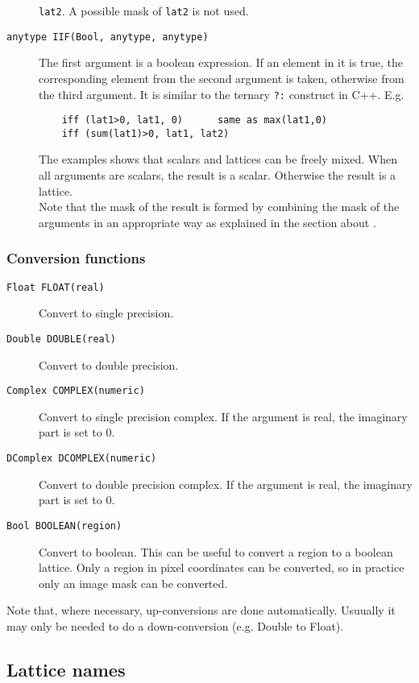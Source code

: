 \begin{description}
    \texttt{lat2}. A possible mask of \texttt{lat2} is not used.
  \item[ \texttt{anytype IIF(Bool, anytype, anytype)}]
    The first argument is a boolean expression. If an element in
    it is true, the corresponding element from the second argument is
    taken, otherwise from the third argument. It is similar to the
    ternary \texttt{?:} construct in C++. E.g.
    \begin{verbatim}
    iff (lat1>0, lat1, 0)      same as max(lat1,0)
    iff (sum(lat1)>0, lat1, lat2)
    \end{verbatim}
    The examples shows that scalars and lattices can be freely mixed.
    When all arguments are scalars, the result is a scalar. Otherwise
    the result is a lattice.
    \\Note that the mask of the result is formed by combining the
    mask of the arguments in an appropriate way as explained in the
    section about .
\end{description}

\subsubsection{Conversion functions}
\begin{description}
  \item[ \texttt{Float FLOAT(real)}]
    Convert to single precision.
  \item[ \texttt{Double DOUBLE(real)}]
    Convert to double precision.
  \item[ \texttt{Complex COMPLEX(numeric)}]
    Convert to single precision complex.
    If the argument is real, the imaginary part is set to 0.
  \item[ \texttt{DComplex DCOMPLEX(numeric)}]
    Convert to double precision complex.
    If the argument is real, the imaginary part is set to 0.
  \item[ \texttt{Bool BOOLEAN(region)}]
    Convert to boolean.
    This can be useful to convert a region to a boolean lattice.
    Only a region in pixel coordinates can be converted, so in
    practice only an image mask can be converted.
\end{description}
Note that, where necessary, up-conversions are done automatically.
Usuually it may only be needed to do a down-conversion (e.g. Double to Float).

\subsection{\label{LEL:LATTICES}Lattice names}

